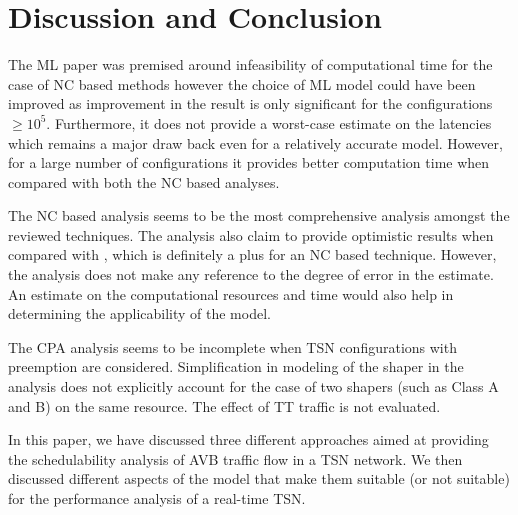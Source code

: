 \documentclass[journal,12pt,twocolumn]{IEEEtran}
\begin{document}
\section{Discussion and Conclusion}
The ML paper \cite{ML} was premised around infeasibility of computational time for the case of NC based methods however the choice of ML model could have been improved as improvement in the result is only significant for the configurations $\geq 10^5$. Furthermore, it does not provide a worst-case estimate on the latencies which remains a major draw back even for a relatively accurate model. However, for a large number of configurations it provides better computation time when compared with both the NC based analyses.

The NC based analysis \cite{NC} seems to be the most comprehensive analysis amongst the reviewed techniques. The analysis also claim to provide optimistic results when compared with \cite{NCCOMPARE}, which is definitely a plus for an NC based technique. However, the analysis does not make any reference to the degree of error in the estimate. An estimate on the computational resources and time would also help in determining the applicability of the model.

The CPA analysis \cite{CPA} seems to be incomplete when TSN configurations with preemption are considered. Simplification in modeling of the shaper in the analysis does not explicitly account for the case of two shapers (such as Class A and B) on the same resource. The effect of TT traffic is not evaluated.

In this paper, we have discussed three different approaches aimed at  providing the schedulability analysis of AVB traffic flow in a TSN network. We then discussed different aspects of the model that make them suitable (or not suitable) for the performance analysis of a real-time TSN. 


\end{document}
